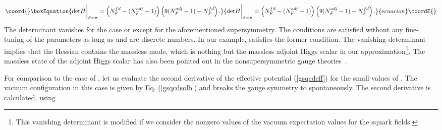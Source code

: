 \documentclass[a4paper,12pt]{article}
\begin{document}
\begin{equation}\coord{}\boxEquation{
{\rm det}H\bigg|_{\beta=\pi}
=\left(N_F^{fd}-(N_F^{adj}-1)\right)\left(9(N_F^{adj}-1)-N_F^{fd}\right).
\label{hessianc}
}{
{\rm det}H\bigg|_{\beta=\pi}
=\left(N_F^{fd}-(N_F^{adj}-1)\right)\left(9(N_F^{adj}-1)-N_F^{fd}\right).
}{ecuacion}\coordE{}\end{equation}
The determinant vanishes for 
the case \coordHE{} or \coordHE{} except for 
the aforementioned \coordHE{} supersymmetry. The conditions are
satisfied without any fine-tuning of the parameters as long 
as \coordHE{} and \coordHE{} are 
discrete numbers. 
In our example, \coordHE{} satisfies 
the former condition. The vanishing determinant implies that the Hessian 
contains the massless mode, which
is nothing but the massless adjoint Higgs scalar 
in our approximation\footnote{This vanishing determinant is modified if we 
consider the nonzero values of the vacuum expectation values for 
the squark fields.}. The massless state of the adjoint Higgs scalar 
has also been pointed out in the nonsupersymmetric 
gauge theories~\cite{intf}.
\par
For comparison to the case of \myHighlight{$\beta=\pi$}\coordHE{}, let us evaluate the second 
derivative of the effective potential (\ref{gsqcdeff}) for the 
small values of \myHighlight{$\beta$}\coordHE{}. 
The vacuum configuration in this case is given by
Eq. (\ref{gsqcdsolb}) and breaks the \coordHE{} gauge symmetry
to \coordHE{} spontaneously. The second derivative is calculated, using 
\end{document}
